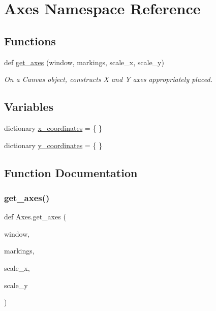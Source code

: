 \hypertarget{namespace_axes}{}\section{Axes Namespace Reference}
\label{namespace_axes}
\subsection*{Functions}
\begin{DoxyCompactItemize}
\item 
def \hyperlink{namespace_axes_a3c548e5160c57a4d0d4214e0e075f614}{get\+\_\+axes} (window, markings, scale\+\_\+x, scale\+\_\+y)
\begin{DoxyCompactList}\small\item\em On a Canvas object, constructs X and Y axes appropriately placed. \end{DoxyCompactList}\end{DoxyCompactItemize}
\subsection*{Variables}
\begin{DoxyCompactItemize}
\item 
dictionary \hyperlink{namespace_axes_a201b8cabbde140fd6d44cfd5f2fcfa00}{x\+\_\+coordinates} = \{ \}
\item 
dictionary \hyperlink{namespace_axes_aee2ce2041bf01f4cac98dc95a987a67d}{y\+\_\+coordinates} = \{ \}
\end{DoxyCompactItemize}


\subsection{Function Documentation}
\hypertarget{namespace_axes_a3c548e5160c57a4d0d4214e0e075f614}{}\label{namespace_axes_a3c548e5160c57a4d0d4214e0e075f614} 
\subsubsection{\texorpdfstring{get\+\_\+axes()}{get\_axes()}}
{\footnotesize\ttfamily def Axes.\+get\+\_\+axes (\begin{DoxyParamCaption}\item[{}]{window,  }\item[{}]{markings,  }\item[{}]{scale\+\_\+x,  }\item[{}]{scale\+\_\+y }\end{DoxyParamCaption})}



